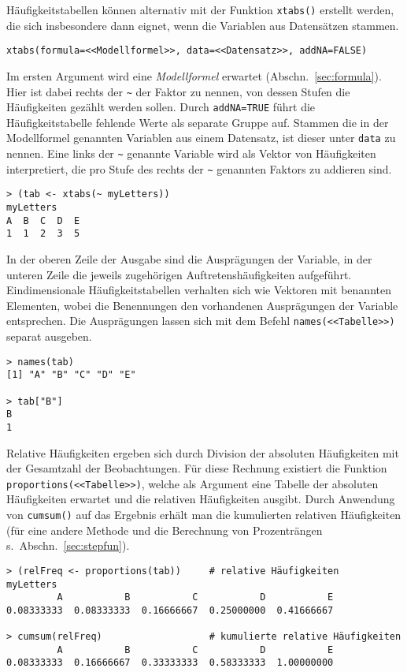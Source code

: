 Häufigkeitstabellen können alternativ mit der Funktion \lstinline!xtabs()! erstellt werden, die sich insbesondere dann eignet, wenn die Variablen aus Datensätzen stammen.
\begin{lstlisting}
xtabs(formula=<<Modellformel>>, data=<<Datensatz>>, addNA=FALSE)
\end{lstlisting}

Im ersten Argument wird eine \emph{Modellformel} erwartet (Abschn.\ \ref{sec:formula}). Hier ist dabei rechts der \lstinline!~! der Faktor zu nennen, von dessen Stufen die Häufigkeiten gezählt werden sollen. Durch \lstinline!addNA=TRUE! führt die Häufigkeitstabelle fehlende Werte als separate Gruppe auf. Stammen die in der Modellformel genannten Variablen aus einem Datensatz, ist dieser unter \lstinline!data! zu nennen. Eine links der \lstinline!~! genannte Variable wird als Vektor von Häufigkeiten interpretiert, die pro Stufe des rechts der \lstinline!~! genannten Faktors zu addieren sind.
\begin{lstlisting}
> (tab <- xtabs(~ myLetters))
myLetters
A  B  C  D  E 
1  1  2  3  5
\end{lstlisting}

In der oberen Zeile der Ausgabe sind die Ausprägungen der Variable, in der unteren Zeile die jeweils zugehörigen Auftretenshäufigkeiten aufgeführt. Eindimensionale Häufigkeitstabellen verhalten sich wie Vektoren mit benannten Elementen, wobei die Benennungen den vorhandenen Ausprägungen der Variable entsprechen. Die Ausprägungen lassen sich mit dem Befehl \lstinline!names(<<Tabelle>>)! separat ausgeben.
\begin{lstlisting}
> names(tab)
[1] "A" "B" "C" "D" "E"

> tab["B"]
B
1
\end{lstlisting}

Relative Häufigkeiten ergeben sich durch Division der absoluten Häufigkeiten mit der Gesamtzahl der Beobachtungen. Für diese Rechnung existiert die Funktion \lstinline!proportions(<<Tabelle>>)!, welche als Argument eine Tabelle der absoluten Häufigkeiten erwartet und die relativen Häufigkeiten ausgibt. Durch Anwendung von \lstinline!cumsum()! auf das Ergebnis erhält man die kumulierten relativen Häufigkeiten (für eine andere Methode und die Berechnung von Prozenträngen s.\ Abschn.\ \ref{sec:stepfun}).
\begin{lstlisting}
> (relFreq <- proportions(tab))     # relative Häufigkeiten
myLetters
         A           B           C           D           E
0.08333333  0.08333333  0.16666667  0.25000000  0.41666667

> cumsum(relFreq)                   # kumulierte relative Häufigkeiten
         A           B           C           D           E
0.08333333  0.16666667  0.33333333  0.58333333  1.00000000
\end{lstlisting}

